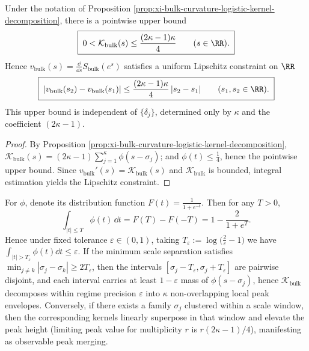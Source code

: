 \begin{corollary}\label{cor:xi-bulk-curvature-max-lipschitz}
Under the notation of Proposition \ref{prop:xi-bulk-curvature-logistic-kernel-decomposition}, there is a pointwise upper bound
\[
\boxed{\;
0<\mathcal{K}_{\mathrm{bulk}}(s)\le \frac{(2\kappa-1)\kappa}{4}\qquad(s\in\RR).\;}
\]
Hence \(v_{\mathrm{bulk}}(s)=\frac{\dd}{\dd s}S_{\mathrm{bulk}}(e^s)\) satisfies a uniform Lipschitz constraint on \(\RR\)
\[
\boxed{\;
|v_{\mathrm{bulk}}(s_2)-v_{\mathrm{bulk}}(s_1)|
\le \frac{(2\kappa-1)\kappa}{4}\,|s_2-s_1|\qquad(s_1,s_2\in\RR).\;}
\]
This upper bound is independent of \(\{\delta_j\}\), determined only by \(\kappa\) and the coefficient \((2\kappa-1)\).
\end{corollary}
\begin{proof}
By Proposition \ref{prop:xi-bulk-curvature-logistic-kernel-decomposition},
\(
\mathcal{K}_{\mathrm{bulk}}(s)=(2\kappa-1)\sum_{j=1}^{\kappa}\phi(s-\sigma_j)
\);
and \(\phi(t)\le \tfrac14\), hence the pointwise upper bound.
Since \(v_{\mathrm{bulk}}'(s)=\mathcal{K}_{\mathrm{bulk}}(s)\) and \(\mathcal{K}_{\mathrm{bulk}}\) is bounded, integral estimation yields the Lipschitz constraint.
\end{proof}

\begin{remark}\label{rem:xi-bulk-curvature-peak-resolution}
For \(\phi\), denote its distribution function \(F(t)=\frac{1}{1+e^{-t}}\). Then for any \(T>0\),
\[
\int_{|t|\le T}\phi(t)\,\dd t
=F(T)-F(-T)
=1-\frac{2}{1+e^{T}}.
\]
Hence under fixed tolerance \(\varepsilon\in(0,1)\), taking \(T_\varepsilon:=\log\!\bigl(\frac{2}{\varepsilon}-1\bigr)\) we have
\(
\int_{|t|>T_\varepsilon}\phi(t)\dd t\le \varepsilon
\).
If the minimum scale separation satisfies \(\min_{j\neq k}|\sigma_j-\sigma_k|\ge 2T_\varepsilon\), then the intervals \([\sigma_j-T_\varepsilon,\sigma_j+T_\varepsilon]\) are pairwise disjoint,
and each interval carries at least \(1-\varepsilon\) mass of \(\phi(s-\sigma_j)\), hence \(\mathcal{K}_{\mathrm{bulk}}\) decomposes within regime precision \(\varepsilon\) into \(\kappa\) non-overlapping local peak envelopes.
Conversely, if there exists a family \(\sigma_j\) clustered within a scale window, then the corresponding kernels linearly superpose in that window and elevate the peak height (limiting peak value for multiplicity \(r\) is \(r(2\kappa-1)/4\)), manifesting as observable peak merging.
\end{remark}

